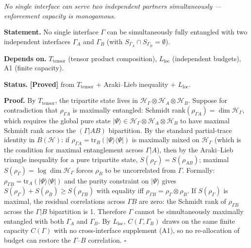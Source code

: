 \documentclass[11pt]{article}
\theoremstyle{remark}
\begin{document}
\begin{tcolorbox}[apfbox, title={$T_M$: Interface Monogamy}]
\textit{No single interface can serve two independent partners simultaneously --- enforcement capacity is monogamous.}

\smallskip\noindent\textbf{Statement.}  No single interface $\Gamma$ can be simultaneously fully entangled with two independent interfaces $\Gamma_A$ and $\Gamma_B$ (with $S_{\Gamma_A} \cap S_{\Gamma_B} = \emptyset$).

\smallskip\noindent\textbf{Depends on.}  $T_{\mathrm{tensor}}$ (tensor product composition), $L_{\mathrm{loc}}$ (independent budgets), A1 (finite capacity).

\smallskip\noindent\textbf{Status.}  \textbf{[Proved]} from $T_{\mathrm{tensor}}$ + Araki--Lieb inequality + $L_{\mathrm{loc}}$.

\smallskip\noindent\textbf{Proof.}  By $T_{\mathrm{tensor}}$, the tripartite state lives in $\mathcal{H}_\Gamma \otimes \mathcal{H}_A \otimes \mathcal{H}_B$.  Suppose for contradiction that $\rho_{\Gamma A}$ is maximally entangled: Schmidt rank$(\rho_{\Gamma A}) = \dim\mathcal{H}_\Gamma$, which requires the global pure state $|\Psi\rangle \in \mathcal{H}_\Gamma \otimes \mathcal{H}_A \otimes \mathcal{H}_B$ to have maximal Schmidt rank across the $(\Gamma|AB)$ bipartition.  By the standard partial-trace identity in $B(\mathcal{H})$: if $\rho_{\Gamma A} = \mathrm{tr}_B(|\Psi\rangle\langle\Psi|)$ is maximally mixed on $\mathcal{H}_\Gamma$ (which is the condition for maximal entanglement across $\Gamma|A$), then by the Araki--Lieb triangle inequality for a pure tripartite state, $S(\rho_\Gamma) = S(\rho_{AB})$; maximal $S(\rho_\Gamma) = \log\dim\mathcal{H}_\Gamma$ forces $\rho_B$ to be uncorrelated from $\Gamma$.  Formally: $\rho_{\Gamma B} = \mathrm{tr}_A(|\Psi\rangle\langle\Psi|)$ and the purity constraint on $|\Psi\rangle$ gives $S(\rho_\Gamma) + S(\rho_B) \ge S(\rho_{\Gamma B})$ with equality iff $\rho_{\Gamma B} = \rho_\Gamma \otimes \rho_B$.  If $S(\rho_\Gamma)$ is maximal, the residual correlations across $\Gamma B$ are zero: the Schmidt rank of $\rho_{\Gamma B}$ across the $\Gamma|B$ bipartition is 1.  Therefore $\Gamma$ cannot be simultaneously maximally entangled with both $\Gamma_A$ and $\Gamma_B$.  By $L_{\mathrm{loc}}$, $C(\Gamma, \Gamma_B)$ draws on the same finite capacity $C(\Gamma)$ with no cross-interface supplement (A1), so no re-allocation of budget can restore the $\Gamma$--$B$ correlation.  \hfill$\square$
\end{tcolorbox}
\end{document}
